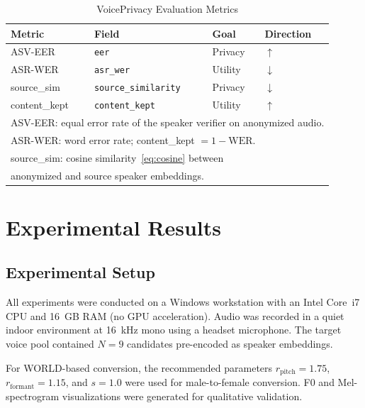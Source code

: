 \documentclass[conference]{IEEEtran}
\begin{document}
\begin{table}[t]
  \caption{VoicePrivacy Evaluation Metrics}
  \label{tab:metrics}
  \begin{center}
  \begin{tabular}{llll}
    \toprule
    \textbf{Metric} & \textbf{Field} & \textbf{Goal} & \textbf{Direction} \\
    \midrule
    ASV-EER          & \texttt{eer}              & Privacy  & $\uparrow$ \\
    ASR-WER          & \texttt{asr\_wer}         & Utility  & $\downarrow$ \\
    source\_sim      & \texttt{source\_similarity} & Privacy & $\downarrow$ \\
    content\_kept    & \texttt{content\_kept}    & Utility  & $\uparrow$ \\
    \bottomrule
    \multicolumn{4}{l}{\small
      ASV-EER: equal error rate of the speaker verifier on anonymized audio.}\\
    \multicolumn{4}{l}{\small
      ASR-WER: word error rate; content\_kept $= 1 - \text{WER}$.}\\
    \multicolumn{4}{l}{\small
      source\_sim: cosine similarity~\eqref{eq:cosine} between}\\
    \multicolumn{4}{l}{\small
      \phantom{source\_sim: }anonymized and source speaker embeddings.}
  \end{tabular}
  \end{center}
\end{table}

\section{Experimental Results}
\label{sec:experiments}

\subsection{Experimental Setup}

All experiments were conducted on a Windows workstation with an
Intel Core~i7 CPU and 16~GB RAM (no GPU acceleration).
Audio was recorded in a quiet indoor environment at 16~kHz mono using
a headset microphone.  The target voice pool contained $N=9$
candidates pre-encoded as speaker embeddings.

For WORLD-based conversion, the recommended parameters
$r_\text{pitch}=1.75$, $r_\text{formant}=1.15$, and $s=1.0$ were
used for male-to-female conversion.  F0 and Mel-spectrogram
visualizations were generated for qualitative validation.
\end{document}
